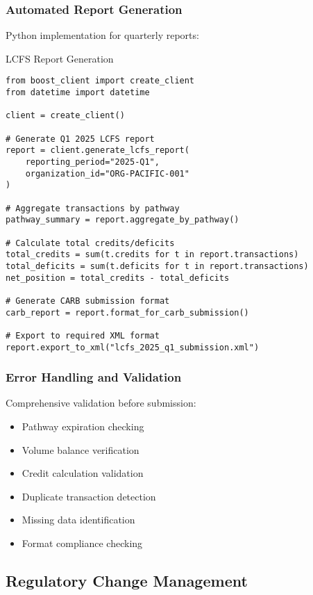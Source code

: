 \subsubsection{Automated Report Generation}

Python implementation for quarterly reports:

\begin{pythonexample}{LCFS Report Generation}
\begin{verbatim}
from boost_client import create_client
from datetime import datetime

client = create_client()

# Generate Q1 2025 LCFS report
report = client.generate_lcfs_report(
    reporting_period="2025-Q1",
    organization_id="ORG-PACIFIC-001"
)

# Aggregate transactions by pathway
pathway_summary = report.aggregate_by_pathway()

# Calculate total credits/deficits
total_credits = sum(t.credits for t in report.transactions)
total_deficits = sum(t.deficits for t in report.transactions)
net_position = total_credits - total_deficits

# Generate CARB submission format
carb_report = report.format_for_carb_submission()

# Export to required XML format
report.export_to_xml("lcfs_2025_q1_submission.xml")
\end{verbatim}
\end{pythonexample}

\subsubsection{Error Handling and Validation}

Comprehensive validation before submission:

\begin{itemize}
    \item Pathway expiration checking
    \item Volume balance verification
    \item Credit calculation validation
    \item Duplicate transaction detection
    \item Missing data identification
    \item Format compliance checking
\end{itemize}

\subsection{Regulatory Change Management}
\label{sec:regulatory-changes}

